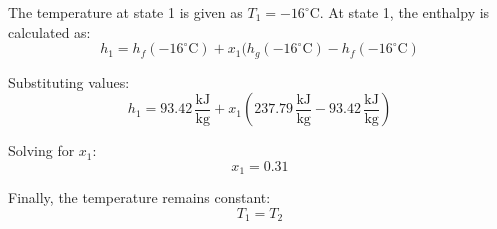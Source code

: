 The temperature at state 1 is given as \( T_1 = -16^\circ\text{C} \). At state 1, the enthalpy is calculated as:
\[
h_1 = h_f(-16^\circ\text{C}) + x_1(h_g(-16^\circ\text{C}) - h_f(-16^\circ\text{C})
\]

Substituting values:
\[
h_1 = 93.42 \, \frac{\text{kJ}}{\text{kg}} + x_1(237.79 \, \frac{\text{kJ}}{\text{kg}} - 93.42 \, \frac{\text{kJ}}{\text{kg}})
\]

Solving for \( x_1 \):
\[
x_1 = 0.31
\]

Finally, the temperature remains constant:
\[
T_1 = T_2
\]